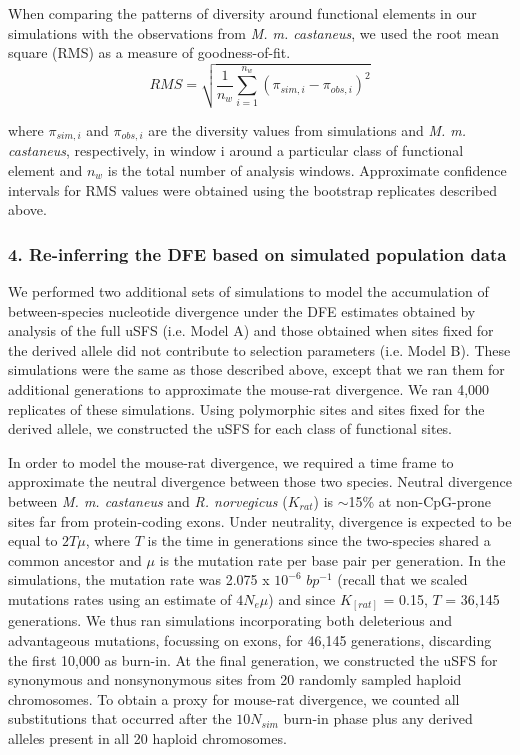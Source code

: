 When comparing the patterns of diversity around functional elements in our simulations with the observations from \textit{M. m. castaneus}, we used the root mean square (RMS) as a measure of goodness-of-fit. 
\begin{equation}
RMS = \sqrt{  \frac{1}{n_w}  \sum_{i=1}^{n_w} (\pi_{sim,i} - \pi_{obs,i})^2  }
\end{equation}

where $\pi_{sim,i}$ and $\pi_{obs,i}$ are the diversity values from simulations and \textit{M. m. castaneus}, respectively, in window i around a particular class of functional element and $n_w$ is the total number of analysis windows. Approximate confidence intervals for RMS values were obtained using the bootstrap replicates described above.

\subsubsection{4. Re-inferring the DFE based on simulated population data}

	We performed two additional sets of simulations to model the accumulation of between-species nucleotide divergence under the DFE estimates obtained by analysis of the full uSFS (i.e. Model A) and those obtained when sites fixed for the derived allele did not contribute to selection parameters (i.e. Model B). These simulations were the same as those described above, except that we ran them for additional generations to approximate the mouse-rat divergence. We ran 4,000 replicates of these simulations. Using polymorphic sites and sites fixed for the derived allele, we constructed the uSFS for each class of functional sites. 

	In order to model the mouse-rat divergence, we required a time frame to approximate the neutral divergence between those two species. Neutral divergence between \textit{M. m. castaneus} and \textit{R. norvegicus} ($K_{rat}$) is $\sim$15\% at non-CpG-prone sites far from protein-coding exons. Under neutrality, divergence is expected to be equal to $2T\mu$, where $T$ is the time in generations since the two-species shared a common ancestor and $\mu$ is the mutation rate per base pair per generation. In the simulations, the mutation rate was 2.075 x $10^{-6}$ $bp^{-1}$ (recall that we scaled mutations rates using an estimate of $4N_e\mu$) and since $K_[rat]$ = 0.15, $T$ = 36,145 generations. We thus ran simulations incorporating both deleterious and advantageous mutations, focussing on exons, for 46,145 generations, discarding the first 10,000 as burn-in. At the final generation, we constructed the uSFS for synonymous and nonsynonymous sites from 20 randomly sampled haploid chromosomes. To obtain a proxy for mouse-rat divergence, we counted all substitutions that occurred after the $10N_{sim}$ burn-in phase plus any derived alleles present in all 20 haploid chromosomes.

